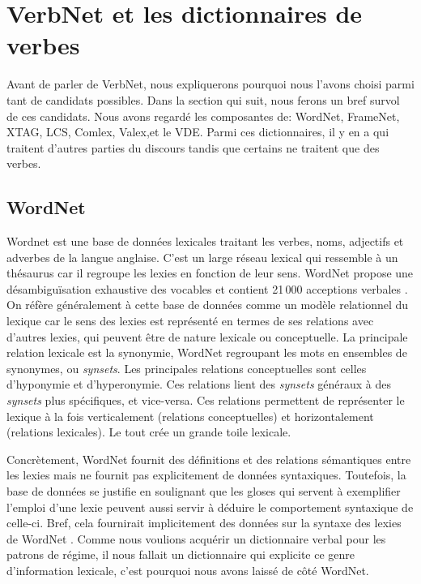 
\chapter{VerbNet et les dictionnaires de verbes}

Avant de parler de VerbNet, nous expliquerons pourquoi nous l'avons choisi parmi tant de candidats possibles. Dans la section qui suit, nous ferons un bref survol de ces candidats. Nous avons regardé les composantes de: WordNet, FrameNet, XTAG, LCS, Comlex, Valex,et le VDE. Parmi ces dictionnaires, il y en a qui traitent d'autres parties du discours tandis que certains ne traitent que des verbes.


\section{WordNet}
Wordnet \citep{Fellbaum1998} est une base de données lexicales traitant les verbes, noms, adjectifs et adverbes de la langue anglaise. C'est un large réseau lexical qui ressemble à un thésaurus car il regroupe les lexies en fonction de leur sens. WordNet propose une désambiguïsation exhaustive des vocables et contient 21\,000 acceptions verbales \citep{MillerWordNetonlinelexical1990}. On réfère généralement à cette base de données comme un modèle relationnel du lexique car le sens des lexies est représenté en termes de ses relations avec d'autres lexies, qui peuvent être de nature lexicale ou conceptuelle. La principale relation lexicale est la synonymie, WordNet regroupant les mots en ensembles de synonymes, ou \emph{synsets}. Les principales relations conceptuelles sont celles d'hyponymie et d'hyperonymie. Ces relations lient des \emph{synsets} généraux à des \emph{synsets} plus spécifiques, et vice-versa. Ces relations permettent de représenter le lexique à la fois verticalement (relations conceptuelles) et horizontalement (relations lexicales). Le tout crée un grande toile lexicale.

Concrètement, WordNet fournit des définitions et des relations sémantiques entre les lexies mais ne fournit pas explicitement de données syntaxiques. Toutefois, la base de données se justifie en soulignant que les gloses qui servent à exemplifier l'emploi d'une lexie peuvent aussi servir à déduire le comportement syntaxique de celle-ci. Bref, cela fournirait implicitement des données sur la syntaxe des lexies de WordNet \citep{FellbaumLargescaleLexicographyDigital2014}. Comme nous voulions acquérir un dictionnaire verbal pour les patrons de régime, il nous fallait un dictionnaire qui explicite ce genre d'information lexicale, c'est pourquoi nous avons laissé de côté WordNet.

